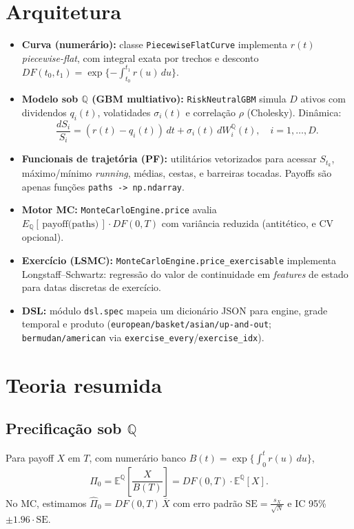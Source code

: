 \documentclass[11pt,a4paper]{article}
\begin{document}
\section{Arquitetura}
\begin{itemize}[leftmargin=1.2em]
\item \textbf{Curva (numerário):} classe \texttt{PiecewiseFlatCurve} implementa $r(t)$ \emph{piecewise-flat}, com integral
exata por trechos e desconto $DF(t_0,t_1)=\exp\{-\int_{t_0}^{t_1} r(u)\,du\}$.
\item \textbf{Modelo sob $\mathbb{Q}$ (GBM multiativo):} \texttt{RiskNeutralGBM} simula $D$ ativos com dividendos $q_i(t)$, volatidades
$\sigma_i(t)$ e correlação $\rho$ (Cholesky). Dinâmica:
\begin{equation}
\frac{dS_i}{S_i} = (r(t)-q_i(t))\,dt + \sigma_i(t)\, dW_i^{\mathbb{Q}}(t), \quad i=1,\dots,D.
\end{equation}
\item \textbf{Funcionais de trajetória (PF):} utilitários vetorizados para acessar $S_{t_k}$, máximo/mínimo \emph{running},
médias, cestas, e barreiras tocadas. Payoffs são apenas funções \verb|paths -> np.ndarray|.
\item \textbf{Motor MC:} \texttt{MonteCarloEngine.price} avalia $E_{\mathbb{Q}}[\,\text{payoff(paths)}\,]\cdot DF(0,T)$
com variância reduzida (antitético, e CV opcional).
\item \textbf{Exercício (LSMC):} \texttt{MonteCarloEngine.price\_exercisable} implementa Longstaff--Schwartz:
regressão do valor de continuidade em \emph{features} de estado para datas discretas de exercício.
\item \textbf{DSL:} módulo \texttt{dsl.spec} mapeia um dicionário JSON para engine, grade temporal e produto
(\texttt{european/basket/asian/up-and-out}; \texttt{bermudan/american} via \texttt{exercise\_every}/\texttt{exercise\_idx}).
\end{itemize}

\section{Teoria resumida}
\subsection{Precificação sob $\mathbb{Q}$}
Para payoff $X$ em $T$, com numerário banco $B(t)=\exp\{\int_0^t r(u)\,du\}$,
\begin{equation}
\Pi_0 = \mathbb{E}^{\mathbb{Q}}\!\left[\frac{X}{B(T)}\right] = DF(0,T)\cdot \mathbb{E}^{\mathbb{Q}}[X].
\end{equation}
No MC, estimamos $\hat \Pi_0 = DF(0,T)\,\overline{X}$ com erro padrão $\mathrm{SE}=\frac{s_X}{\sqrt{N}}$ e IC 95\% $\pm 1.96\cdot \mathrm{SE}$.
\end{document}
